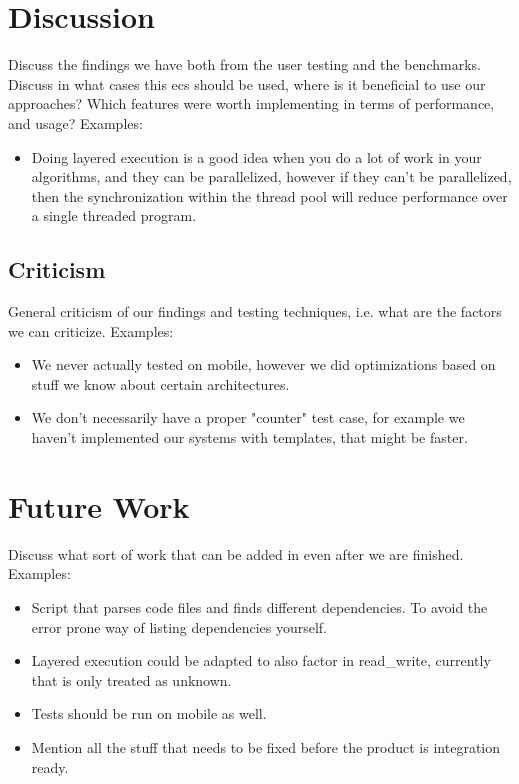\chapter{Discussion}
\label{chap:discussion}
Discuss the findings we have both from the user testing and the benchmarks.
Discuss in what cases this ecs should be used, where is it beneficial to use our approaches?
Which features were worth implementing in terms of performance,
and usage?
Examples:
\begin{itemize}
    \item
    Doing layered execution is a good idea when you do a lot of work in your algorithms, and they can be parallelized,
    however if they can't be parallelized, then the synchronization within the thread pool will reduce performance over a single threaded program.
\end{itemize}

\section{Criticism}
General criticism of our findings and testing techniques,
i.e. what are the factors we can criticize.
Examples:
\begin{itemize}
    \item
    We never actually tested on mobile, however we did optimizations based on stuff we know about certain architectures.

    \item
    We don't necessarily have a proper "counter" test case, for example we haven't implemented our systems with templates, that might be faster.
\end{itemize}

\chapter{Future Work}
\label{chap:future_work}
Discuss what sort of work that can be added in even after we are finished.
Examples:
\begin{itemize}
    \item
    Script that parses code files and finds different dependencies.
    To avoid the error prone way of listing dependencies yourself.

    \item
    Layered execution could be adapted to also factor in read\_write, currently that is only treated as unknown.

    \item
    Tests should be run on mobile as well.

    \item
    Mention all the stuff that needs to be fixed before the product is integration ready.
\end{itemize}

